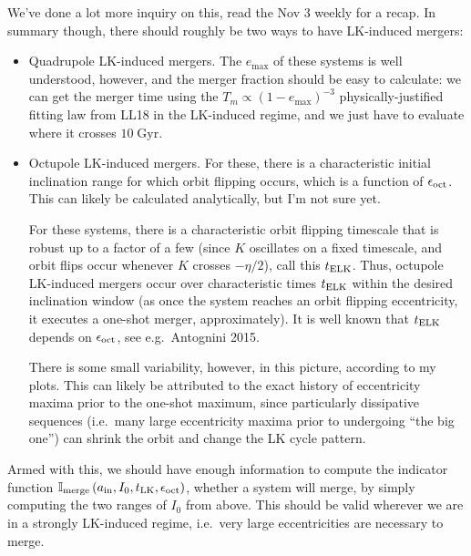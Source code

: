 \documentclass[11pt,
        usenames, %
        dvipsnames %
    ]{article}
\newcommand*{\p}[1]{\left(#1\right)}
\begin{document}
We've done a lot more inquiry on this, read the Nov 3 weekly for a recap. In
summary though, there should roughly be two ways to have LK-induced mergers:
\begin{itemize}
    \item Quadrupole LK-induced mergers. The $e_{\max}$ of these systems is well
        understood, however, and the merger fraction should be easy to
        calculate: we can get the merger time using the $T_m \propto \p{1 -
        e_{\max}}^{-3}$ physically-justified fitting law from LL18 in the
        LK-induced regime, and we just have to evaluate where it crosses
        $10\;\mathrm{Gyr}$.

    \item Octupole LK-induced mergers. For these, there is a characteristic
        initial inclination range for which orbit flipping occurs, which is a
        function of $\epsilon_{\rm oct}$. This can likely be calculated
        analytically, but I'm not sure yet.

        For these systems, there is a characteristic orbit flipping timescale
        that is robust up to a factor of a few (since $K$ oscillates on a fixed
        timescale, and orbit flips occur whenever $K$ crosses $-\eta/2$), call
        this $t_{\rm ELK}$. Thus, octupole LK-induced mergers occur over
        characteristic times $t_{\rm ELK}$ within the desired inclination window
        (as once the system reaches an orbit flipping eccentricity, it executes
        a one-shot merger, approximately). It is well known that $t_{\rm ELK}$
        depends on $\epsilon_{\rm oct}$, see e.g.\ Antognini 2015.

        There is some small variability, however, in this picture, according to
        my plots. This can likely be attributed to the exact history of
        eccentricity maxima prior to the one-shot maximum, since particularly
        dissipative sequences (i.e.\ many large eccentricity maxima prior to
        undergoing ``the big one'') can shrink the orbit and change the LK cycle
        pattern.
\end{itemize}

Armed with this, we should have enough information to compute the indicator
function $\mathbb{I}_{\rm merge}\p{a_{\rm in}, I_0, t_{\rm LK}, \epsilon_{\rm
oct}}$, whether a system will merge, by simply computing the two ranges of $I_0$
from above. This should be valid wherever we are in a strongly LK-induced
regime, i.e.\ very large eccentricities are necessary to merge.
\end{document}
